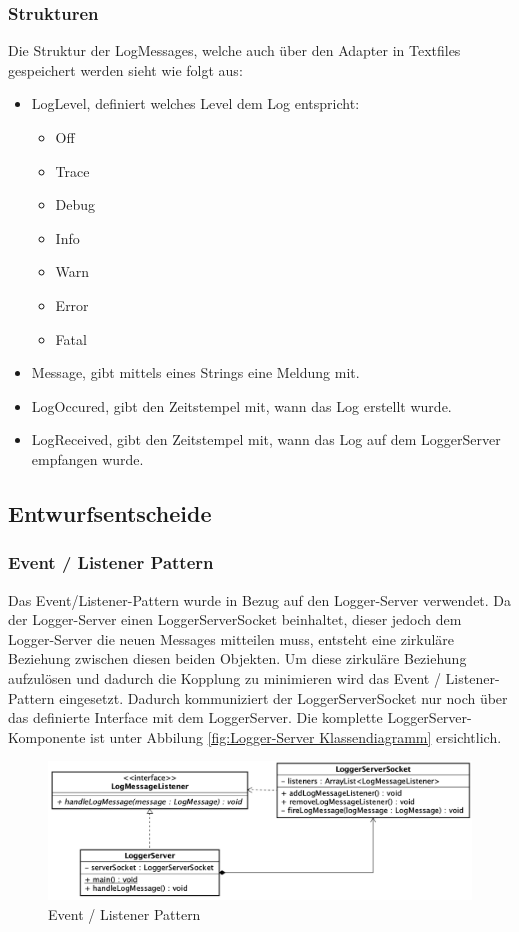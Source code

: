 \subsubsection{Strukturen}
Die Struktur der LogMessages, welche auch über den Adapter in Textfiles gespeichert werden sieht wie folgt aus:
\begin{itemize}
	\item LogLevel, definiert welches Level dem Log entspricht:
	\begin{itemize}
		\item Off
		\item Trace
		\item Debug
		\item Info
		\item Warn
		\item Error
		\item Fatal
	\end{itemize}
	\item Message, gibt mittels eines Strings eine Meldung mit.
	\item LogOccured, gibt den Zeitstempel mit, wann das Log erstellt wurde.
	\item LogReceived, gibt den Zeitstempel mit, wann das Log auf dem LoggerServer empfangen wurde.
\end{itemize}

\subsection{Entwurfsentscheide}
\subsubsection{Event / Listener Pattern}
Das Event/Listener-Pattern wurde in Bezug auf den Logger-Server verwendet. Da der Logger-Server einen LoggerServerSocket beinhaltet, dieser jedoch dem Logger-Server die neuen Messages mitteilen muss, entsteht eine zirkuläre Beziehung zwischen diesen beiden Objekten. 
Um diese zirkuläre Beziehung aufzulösen und dadurch die Kopplung zu minimieren wird das Event / Listener-Pattern eingesetzt. Dadurch kommuniziert der LoggerServerSocket nur noch über das definierte Interface mit dem LoggerServer. Die komplette LoggerServer-Komponente ist unter Abbilung \ref{fig:Logger-Server Klassendiagramm} ersichtlich.
\begin{figure}[H]
	\centering
	\includegraphics[width=\textwidth]{2_Architektur/Bilder/loggerServer_EventListener.png}
	\caption{Event / Listener Pattern}
	\label{fig:Event / Listener Pattern}
\end{figure}

